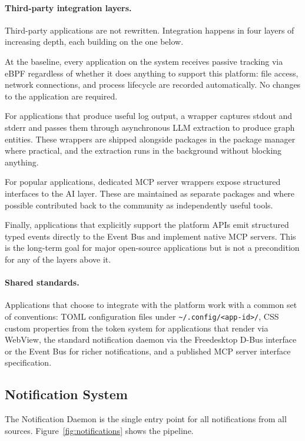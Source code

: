 \paragraph{Third-party integration layers.}
Third-party applications are not rewritten. Integration happens in four layers
of increasing depth, each building on the one below.

At the baseline, every application on the system receives passive tracking via
eBPF regardless of whether it does anything to support this platform: file
access, network connections, and process lifecycle are recorded automatically.
No changes to the application are required.

For applications that produce useful log output, a wrapper captures stdout and
stderr and passes them through asynchronous LLM extraction to produce graph
entities. These wrappers are shipped alongside packages in the package manager
where practical, and the extraction runs in the background without blocking
anything.

For popular applications, dedicated MCP server wrappers expose structured
interfaces to the AI layer. These are maintained as separate packages and
where possible contributed back to the community as independently useful tools.

Finally, applications that explicitly support the platform APIs emit structured
typed events directly to the Event Bus and implement native MCP servers. This
is the long-term goal for major open-source applications but is not a
precondition for any of the layers above it.

\paragraph{Shared standards.}
Applications that choose to integrate with the platform work with a common set
of conventions: TOML configuration files under
\texttt{\textasciitilde/.config/<app-id>/}, CSS custom properties from the
token system for applications that render via WebView, the standard
notification daemon via the Freedesktop D-Bus interface or the Event Bus for
richer notifications, and a published MCP server interface specification.

\subsection{Notification System}
\label{sec:notifications}

The Notification Daemon is the single entry point for all notifications from
all sources. Figure~\ref{fig:notifications} shows the pipeline.

